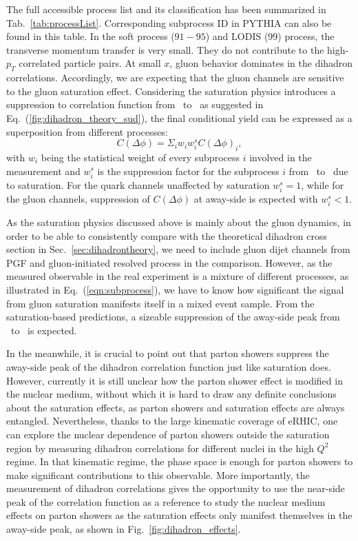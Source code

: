 The full accessible process list and its classification has been summarized in
Tab.~\ref{tab:processList}. Corresponding subprocess ID in PYTHIA can also be found in this table. In the soft process ($91-95$) and LODIS (99)
process, the transverse momentum transfer is very small. They do not contribute
to the high-$p_{T}$ correlated particle pairs. At small $x$, gluon behavior
dominates in the dihadron correlations. Accordingly, we are expecting that the gluon channels are sensitive to the gluon saturation effect. Considering the
saturation physics introduces a suppression to correlation function from \ep\ to
\eA\ as suggested in Eq.~(\ref{fig:dihadron_theory_sud}), the final conditional
yield can be expressed as a superposition from different processes:
\begin{equation} 
C(\Delta\phi)=\Sigma_{i}w_{i}w^{s}_{i}C(\Delta\phi)_{i},
\label{eqn:subprocess} 
\end{equation}
with $w_{i}$ being the statistical weight of every subprocess $i$ involved in
the measurement and $w^{s}_{i}$ is the suppression factor for the subprocess $i$
from \ep\ to \eA\ due to saturation. For the quark channels unaffected by saturation $w^{s}_{i}=1$,
while for the gluon channels, suppression of $C(\Delta\phi)$ at away-side is
expected with $w^{s}_{i}<1$.


As the saturation physics discussed above is mainly about the gluon dynamics, in
order to be able to consistently compare with the theoretical dihadron cross
section in Sec.~\ref{sec:dihadrontheory}, we need to include gluon dijet channels from
PGF and gluon-initiated resolved process in the comparison. However, as the
measured observable in the real experiment is a mixture of different processes, as
illustrated in Eq.~(\ref{eqn:subprocess}), we have to know how significant the
signal from gluon saturation manifests itself in a mixed event sample. From the
saturation-based predictions, a sizeable suppression of the away-side peak from \ep\
to \eA\ is expected.

In the meanwhile, it is crucial to point out that parton showers suppress the
away-side peak of the dihadron correlation function just like saturation does.
However, currently it is still unclear how the parton shower effect is modified
in the nuclear medium, without which it is hard to draw any definite conclusions
about the saturation effects, as parton showers and saturation effects are always
entangled. Nevertheless, thanks to the large kinematic coverage of eRHIC, one
can explore the nuclear dependence of parton showers outside the saturation
region by measuring dihadron correlations for different nuclei in the high
$Q^2$ regime. In that kinematic regime, the phase space is enough for parton
showers to make significant contributions to this observable. More importantly, the measurement of dihadron
correlations gives the opportunity to use the near-side peak of the correlation
function as a reference to study the nuclear medium effects on parton showers as
the saturation effects only manifest themselves in the away-side peak, as shown
in Fig.~\ref{fig:dihadron_effects}.

